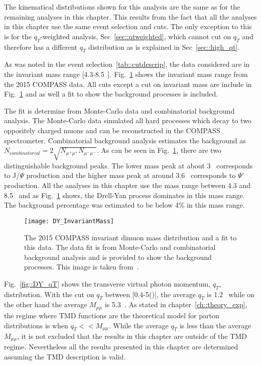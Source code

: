 The kinematical distributions shown for this analysis are the same as for the
remaining analyses in this chapter.  This results from the fact that all the
analyses in this chapter use the same event selection and cuts.  The only
exception to this is for the $q_T$-weighted analysis, Sec~\ref{sec::qtweighted},
which cannot cut on $q_T$ and therefore has a different $q_T$ distribution as is
explained in Sec~\ref{sec::high_qt}.

As was noted in the event selection~\ref{tab::cutdescrip}, the data considered
are in the invariant mass range [4.3-8.5~{\gvcw}].
Fig.~\ref{fig::DY_InvariantMass} shows the invariant mass range from the 2015
COMPASS data.  All cuts except a cut on invariant mass are include in
Fig.~\ref{fig::DY_InvariantMass} and as well a fit to show the background
processes is included.

The fit is determine from Monte-Carlo data and combinatorial background
analysis.  The Monte-Carlo data simulated all hard processes which decay to two
oppositely charged muons and can be reconstructed in the COMPASS spectrometer.
Combinatorial background analysis estimates the background as $N_{combinatorial}
= 2\sqrt{N_{\mu^+\mu^+}N_{\mu^-\mu^-}}$.  As can be seen in
Fig.~\ref{fig::DY_InvariantMass}, there are two distinguishable background
peaks.  The lower mass peak at about 3~{\gvcw} corresponds to J/$\Psi$
production and the higher mass peak at around 3.6~{\gvcw} corresponds to $\Psi$'
production.  All the analyses in this chapter use the mass range between 4.3 and
8.5~{\gvcw} and as Fig.~\ref{fig::DY_InvariantMass} shows, the Drell-Yan process
dominates in this mass range.  The background percentage was estimated to be
below 4\% in this mass range.

\begin{figure}[h!t]
  \centering \texttt{[image: DY\_InvariantMass]}
  \caption{The 2015 COMPASS invariant dimuon mass distribution and a fit to this
    data.  The data fit is from Monte-Carlo and combinatorial background
    analysis and is provided to show the background processes.  This image is
    taken from~\cite{compassDYpaper}.}
  \label{fig::DY_InvariantMass}
\end{figure}

Fig.~\ref{fig::DY_qT} shows the transverse virtual photon momentum, $q_T$,
distribution.  With the cut on $q_T$ between [0.4-5({\gvc})], the average $q_T$
is 1.2~{\gvc} while on the other hand the average $M_{\mu\mu}$ is 5.3~{\gvcw}.
As stated in chapter~\ref{ch::theory_exp}, the regime where TMD functions are
the theoretical model for parton distributions is when $q_T << M_{\mu\mu}$.
While the average $q_T$ is less than the average $M_{\mu\mu}$, it is not
excluded that the results in this chapter are outside of the TMD regime.
Nevertheless all the results presented in this chapter are determined assuming
the TMD description is valid.


